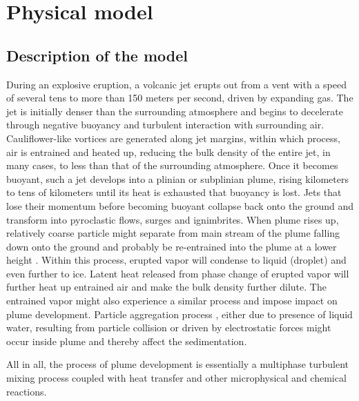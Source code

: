 \documentclass[journal abbreviation, manuscript]{copernicus}
\begin{document}
\section{Physical model} \label{sec:physics-model}
\subsection{Description of the model}
During an explosive eruption, a volcanic jet erupts out from a vent with a speed of several tens to more than 150 meters per second, driven by expanding gas. The jet is initially denser than the surrounding atmosphere and begins to decelerate through negative buoyancy and turbulent interaction with surrounding air. Cauliflower-like vortices are generated along jet margins, within which process, air is entrained and heated up, reducing the bulk density of the entire jet, in many cases, to less than that of the surrounding atmosphere. Once it becomes buoyant, such a jet develops into a plinian or subplinian plume, rising kilometers to tens of kilometers until its heat is exhausted that buoyancy is lost. Jets that lose their momentum before becoming buoyant collapse back onto the ground and transform into pyroclastic flows, surges and ignimbrites. When plume rises up, relatively coarse particle might separate from main stream of the plume falling down onto the ground and probably be re-entrained into the plume at a lower height \citep{ernst1996sedimentation}. Within this process, erupted vapor will condense to liquid (droplet) and even further to ice. Latent heat released from phase change of erupted vapor will further heat up entrained air and make the bulk density further dilute. The entrained vapor might also experience a similar process and impose impact on plume development. Particle aggregation process \citep{carey1982influence,taddeucci2011aggregation}, either due to presence of liquid water, resulting from particle collision or driven by electrostatic forces might occur inside plume and thereby affect the sedimentation. 

All in all, the process of plume development is  essentially a multiphase turbulent mixing process coupled with heat transfer and other microphysical and chemical reactions.
\end{document}
